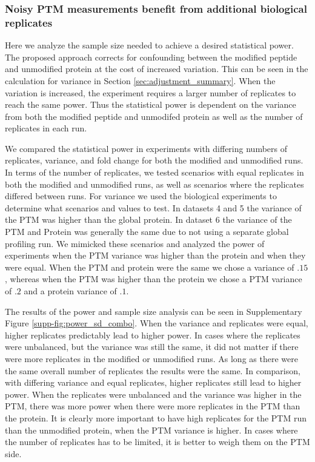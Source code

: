\documentclass[mcp]{article}
\numberwithin{table}{section}
\begin{document}
\subsubsection*{Noisy PTM measurements benefit from additional biological replicates}

Here we analyze the sample size needed to achieve a desired statistical power. The proposed approach corrects for confounding between the modified peptide and unmodified protein at the cost of increased variation. This can be seen in the calculation for variance in Section \ref{sec:adjustment_summary}. When the variation is increased, the experiment requires a larger number of replicates to reach the same power. Thus the statistical power is dependent on the variance from both the modified peptide and unmodifed protein as well as the number of replicates in each run.

We compared the statistical power in experiments with differing numbers of replicates, variance, and fold change for both the modified and unmodified runs. In terms of the number of replicates, we tested scenarios with equal replicates in both the modified and unmodified runs, as well as scenarios where the replicates differed between runs. For variance we used the biological experiments to determine what scenarios and values to test. In datasets 4 and 5 the variance of the PTM was higher than the global protein. In dataset 6 the variance of the PTM and Protein was generally the same due to not using a separate global profiling run. We mimicked these scenarios and analyzed the power of experiments when the PTM variance was higher than the protein and when they were equal. When the PTM and protein were the same we chose a variance of $.15$, whereas when the PTM was higher than the protein we chose a PTM variance of $.2$ and a protein variance of $.1$.

The results of the power and sample size analysis can be seen in Supplementary Figure \ref{supp-fig:power_sd_combo}. When the variance and replicates were equal, higher replicates predictably lead to higher power. In cases where the replicates were unbalanced, but the variance was still the same, it did not matter if there were more replicates in the modified or unmodified runs. As long as there were the same overall number of replicates the results were the same. In comparison, with differing variance and equal replicates, higher replicates still lead to higher power. When the replicates were unbalanced and the variance was higher in the PTM, there was more power when there were more replicates in the PTM than the protein. It is clearly more important to have high replicates for the PTM run than the unmodified protein, when the PTM variance is higher. In cases where the number of replicates has to be limited, it is better to weigh them on the PTM side.
\end{document}
